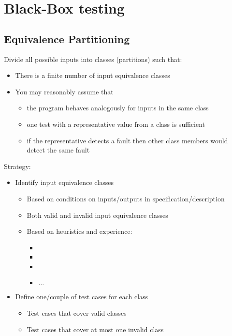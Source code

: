 \section{Black-Box testing}
		
\subsection{Equivalence Partitioning}
	
Divide all possible inputs into classes (partitions) such that:
\begin{itemize}
	\item There is a finite number of input equivalence classes
	\item You may reasonably assume that
	\begin{itemize}
		\item the program behaves analogously for inputs in the same class
		\item one test with a representative value from a class is sufficient
		\item if the representative detects a fault
		then other class members would detect the same fault
	\end{itemize}
\end{itemize}
				
				
Strategy:
\begin{itemize}
	\item Identify input equivalence classes
	\begin{itemize}
		\item Based on conditions on inputs/outputs in specification/description
		\item Both valid and invalid input equivalence classes
		\item Based on heuristics and experience:
		\begin{itemize}
			\item
			\item
			\item
			\item$\ldots$
		\end{itemize}
	\end{itemize}
	\item Define one/couple of test cases for each class
	\begin{itemize}
		\item Test cases that cover valid classes
		\item Test cases that cover at most one invalid class
	\end{itemize}
\end{itemize}
				
